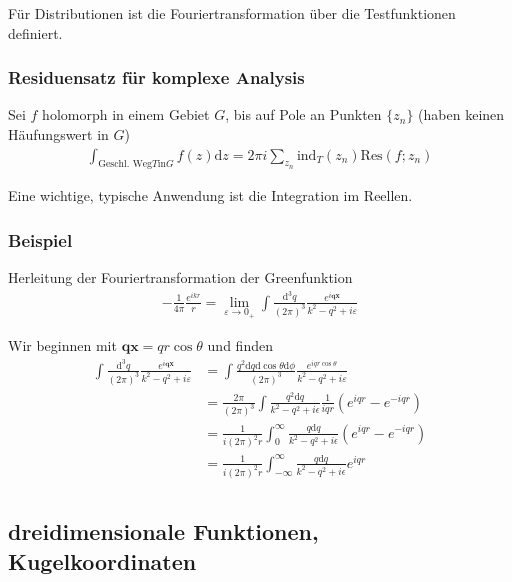\documentclass[11pt,a4paper]{report}
\begin{document}
Für Distributionen ist die Fouriertransformation über die Testfunktionen definiert.
\subsubsection{Residuensatz für komplexe Analysis}

Sei $f$ holomorph in einem Gebiet $G$, bis auf Pole an Punkten $\{z_n\}$ (haben keinen Häufungswert in $G$)
\begin{align*}
    \int_{\text{Geschl. Weg} T \text{in} G} f(z) \mathrm{d}z = 2\pi i \sum_{z_n} \mathrm{ind}_T(z_n) \mathrm{Res}(f; z_n) 
\end{align*}

Eine wichtige, typische Anwendung ist die Integration im Reellen.

\subsubsection{Beispiel}

Herleitung der Fouriertransformation der Greenfunktion
\begin{align*}
    - \frac{1}{4\pi} \frac{e^{i k r}}{r} = \lim_{\varepsilon \rightarrow 0_+} \int \frac{\mathrm{d}^3 q}{(2\pi)^3} \frac{e^{i \mathbf{q} \mathbf{x}}}{k^2 - q^2 + i \varepsilon}
\end{align*}

Wir beginnen mit $\mathbf{q} \mathbf{x} = q r \cos \theta$ und finden 
\begin{align*}
    \int \frac{\mathrm{d}^3 q}{(2\pi)^3} \frac{e^{i \mathbf{q} \mathbf{x}}}{k^2 - q^2 + i \varepsilon} &= \int \frac{q^2 \mathrm{d}q \mathrm{d}\cos \theta \mathrm{d}\phi}{(2\pi)^3} \frac{e^{i q r \cos \theta}}{k^2 - q^2 + i \varepsilon} \\ 
    &= \frac{2\pi}{(2\pi)^3} \int \frac{q^2 \mathrm{d}q}{k^2 - q^2 + i \epsilon} \frac{1}{i q r} \left(e^{i q r} - e^{-i q r}\right) \\ 
    &= \frac{1}{i (2\pi)^2 r} \int_0^\infty \frac{q \mathrm{d}q}{k^2 - q^2 + i \epsilon} \left(e^{i q r} - e^{-i q r}\right) \\ 
    &= \frac{1}{i (2\pi)^2 r} \int_{-\infty}^\infty \frac{q \mathrm{d}q}{k^2 - q^2 + i \epsilon} e^{i q r} \\ 
\end{align*}

\subsection{dreidimensionale Funktionen, Kugelkoordinaten}
\end{document}

